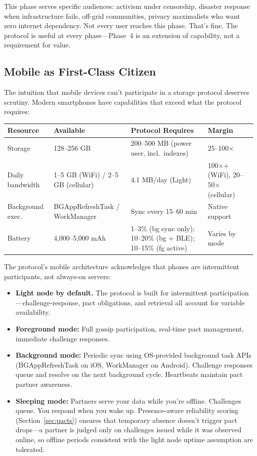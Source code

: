 \documentclass[11pt,a4paper]{article}
\begin{document}
This phase serves specific audiences: activism under censorship, disaster response when infrastructure fails, off-grid communities, privacy maximalists who want zero internet dependency. Not every user reaches this phase. That's fine. The protocol is useful at every phase---Phase~4 is an extension of capability, not a requirement for value.

\subsection{Mobile as First-Class Citizen}

The intuition that mobile devices can't participate in a storage protocol deserves scrutiny. Modern smartphones have capabilities that exceed what the protocol requires:

\begin{table}[h]
\centering
\small
\begin{tabular}{llll}
\toprule
\textbf{Resource} & \textbf{Available} & \textbf{Protocol Requires} & \textbf{Margin} \\
\midrule
Storage & 128--256 GB & 200--500 MB (power user, incl.\ indexes) & 25--100$\times$ \\
Daily bandwidth & 1--5 GB (WiFi) / 2--5 GB (cellular) & 4.1 MB/day (Light) & 100$\times$+ (WiFi), 20--50$\times$ (cellular) \\
Background exec. & BGAppRefreshTask / WorkManager & Sync every 15--60 min & Native support \\
Battery & 4,000--5,000 mAh & 1--3\% (bg sync only); 10--20\% (bg + BLE); 10--15\% (fg active) & Varies by mode \\
\bottomrule
\end{tabular}
\end{table}

The protocol's mobile architecture acknowledges that phones are intermittent participants, not always-on servers:

\begin{itemize}
  \item \textbf{Light node by default.} The protocol is built for intermittent participation---challenge-response, pact obligations, and retrieval all account for variable availability.
  \item \textbf{Foreground mode:} Full gossip participation, real-time pact management, immediate challenge responses.
  \item \textbf{Background mode:} Periodic sync using OS-provided background task APIs (BGAppRefreshTask on iOS, WorkManager on Android). Challenge responses queue and resolve on the next background cycle. Heartbeats maintain pact partner awareness.
  \item \textbf{Sleeping mode:} Partners serve your data while you're offline. Challenges queue. You respond when you wake up. Presence-aware reliability scoring (Section~\ref{sec:pacts}) ensures that temporary absence doesn't trigger pact drops---a partner is judged only on challenges issued while it was observed online, so offline periods consistent with the light node uptime assumption are tolerated.
\end{itemize}
\end{document}
